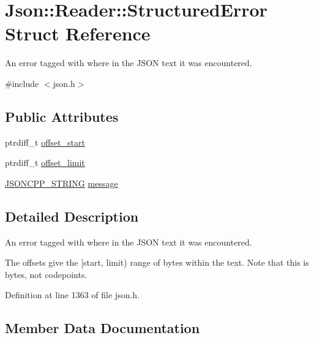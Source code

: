 \hypertarget{struct_json_1_1_reader_1_1_structured_error}{}\section{Json\+:\+:Reader\+:\+:Structured\+Error Struct Reference}
\label{struct_json_1_1_reader_1_1_structured_error}


An error tagged with where in the J\+S\+ON text it was encountered.  




{\ttfamily \#include $<$json.\+h$>$}

\subsection*{Public Attributes}
\begin{DoxyCompactItemize}
\item 
ptrdiff\+\_\+t \hyperlink{struct_json_1_1_reader_1_1_structured_error_ac98af0da2d704be4b64a9572a682423b}{offset\+\_\+start}
\item 
ptrdiff\+\_\+t \hyperlink{struct_json_1_1_reader_1_1_structured_error_ad76ac01aeb0ada7e882c2df5daa54c6e}{offset\+\_\+limit}
\item 
\hyperlink{config_8h_a1e723f95759de062585bc4a8fd3fa4be}{J\+S\+O\+N\+C\+P\+P\+\_\+\+S\+T\+R\+I\+NG} \hyperlink{struct_json_1_1_reader_1_1_structured_error_a2d2dc387aefe406a71de3daa263a38f4}{message}
\end{DoxyCompactItemize}


\subsection{Detailed Description}
An error tagged with where in the J\+S\+ON text it was encountered. 

The offsets give the \mbox{[}start, limit) range of bytes within the text. Note that this is bytes, not codepoints. 

Definition at line 1363 of file json.\+h.



\subsection{Member Data Documentation}
\hypertarget{struct_json_1_1_reader_1_1_structured_error_a2d2dc387aefe406a71de3daa263a38f4}{}\label{struct_json_1_1_reader_1_1_structured_error_a2d2dc387aefe406a71de3daa263a38f4} 
